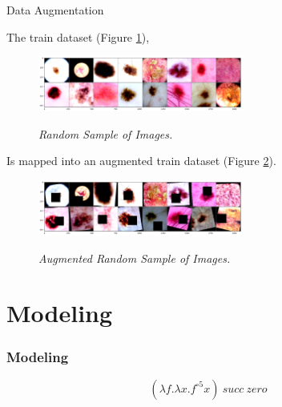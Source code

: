 \documentclass[dvipsnames,mathserif]{beamer}
\begin{document}
{\begin{frame}
    \end{frame}

    \begin{frame}

      \large Data Augmentation
      \vspace{0.25cm}

      \footnotesize

      The train dataset (Figure \ref{fig:sample-of-datasets}),

      \begin{figure}[H]
        \centering
        \includegraphics[width=0.6\textwidth]{images/random-sample-of-isic.png}
        \caption[Random Sample of Images]{\footnotesize{\textit{Random Sample of Images.}}}
        {\label{fig:sample-of-datasets}}
      \end{figure}

      Is mapped into an augmented train dataset (Figure \ref{fig:aug-sample-of-datasets}).

      \begin{figure}[H]
        \centering
        \includegraphics[width=0.6\textwidth]{images/random-sample-of-isic-augmented.png}
        \caption[Augmented Random Sample of Images]{\footnotesize{\textit{Augmented Random Sample of Images.}}}
        {\label{fig:aug-sample-of-datasets}}
      \end{figure}

    \end{frame}


    \section{Modeling}

    \begin{frame}
      \frametitle{Modeling}

      \[(\lambda f. \lambda x. f^{\circ 5} x)\ succ\ zero\]
    \end{frame}

    \begin{frame}


\end{frame}}
\end{document}
